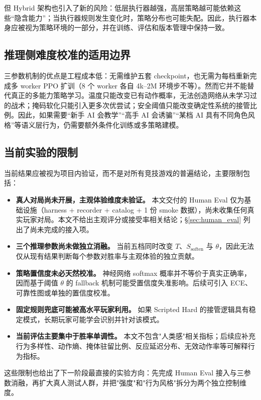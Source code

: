 \documentclass[UTF8,a4paper,11pt]{ctexart}
\begin{document}
但 Hybrid 架构也引入了新的风险：低层执行器越强，高层策略越可能依赖这些“隐含能力”；当执行器规则发生变化时，策略分布也可能失配。因此，执行器本身应被视为策略环境的一部分，并在训练、评估和版本管理中保持一致。

\subsection{推理侧难度校准的适用边界}
三参数机制的优点是工程成本低：无需维护五套 checkpoint，也无需为每档重新完成多 worker PPO 扩训（8 个 worker 各自 4k–2M 环境步不等）。然而它并不能替代真正的多能力策略学习。温度只能改变已有动作概率，无法创造网络从未学习过的战术；掩码软化只能引入更多次优尝试；安全阈值只能改变确定性系统的接管比例。因此，如果需要“新手 AI 会教学”“高手 AI 会诱骗”“某档 AI 具有不同角色风格”等语义层行为，仍需要额外条件化训练或多策略建模。

\subsection{当前实验的限制}
当前结果应被视为项目内验证，而不是对所有竞技游戏的普遍结论，主要限制包括：

\begin{itemize}
    \item \textbf{真人对局尚未开展，主观体验维度未验证。}
    本文交付的 Human Eval 仅为基础设施（harness + recorder + catalog + 1 份 smoke 数据），尚未收集任何真实玩家对局。本文不给出主观评分或接受率相关结论；§\ref{sec:human_eval} 列出了尚未完成的接入项。
    \item \textbf{三个推理参数尚未做独立消融。}
    当前五档同时改变 $T$、$S_{\mathrm{soften}}$ 与 $\theta$，因此无法仅从现有结果判断每个参数对胜率与主观体验的独立贡献。
    \item \textbf{策略置信度未必天然校准。}
    神经网络 softmax 概率并不等价于真实正确率，因而基于阈值 $\theta$ 的 fallback 机制可能受置信度失准影响。后续可引入 ECE、可靠性图或单独的置信度校准。
    \item \textbf{固定规则兜底可能被高水平玩家利用。}
    如果 Scripted Hard 的接管逻辑具有稳定模式，长期玩家可能学会识别并针对该模式。
    \item \textbf{当前评估主要集中于胜率单调性。}
    本文不包含"人类感"相关指标；后续应补充行为多样性、动作熵、掩体驻留比例、反应延迟分布、无效动作率等可解释行为指标。
\end{itemize}

这些限制也给出了下一阶段最直接的实验方向：先完成 Human Eval 接入与三参数消融，再扩大真人测试人群，并把"强度"和"行为风格"拆分为两个独立控制维度。
\end{document}
